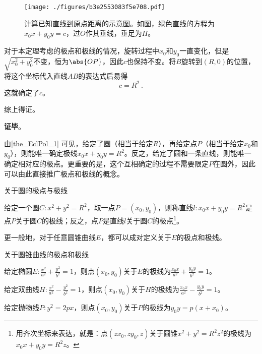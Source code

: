 \begin{figure}[ht]
\centering
\texttt{[image: ./figures/b3e2553083f5e708.pdf]}
\caption{计算已知直线到原点距离的示意图。如图，绿色直线的方程为$x_0x+y_0y=c$，过$O$作其垂线，垂足为$H$。} \label{fig_EclPol_2}
\end{figure}


对于本定理考虑的极点和极线的情况，旋转过程中$x_0$和$y_0$一直变化，但是$\sqrt{x_0^2+y_0^2}$不变，恒为$\abs{OP}$，因此$c$也保持不变。将$B$旋转到$(R, 0)$的位置，将这个坐标代入直线$AB$的表达式后易得
\begin{equation}
c=R^2~. 
\end{equation}
这就确定了$c$。

综上得证。

\textbf{证毕}。



由\autoref{the_EclPol_1} 可见，给定了圆（相当于给定$R$），再给定点$P$（相当于给定$x_0$和$y_0$），则能唯一确定极线$x_0x+y_0y=R^2$。反之，给定了圆和一条直线，则能唯一确定相对应的极点。更重要的是，这个互相确定的过程不需要限定$P$在圆外，因此可以由此直接推广极点和极线的概念。




\begin{definition}{关于圆的极点与极线}\label{def_EclPol_2}

给定一个圆$C: x^2+y^2=R^2$，取一点$P=(x_0, y_0)$，则称直线$l:x_0x+y_0y=R^2$是点$P$关于圆$C$的极线；反之，点$P$是直线$l$关于圆$C$的极点\footnote{用齐次坐标来表达，就是：点$(zx_0, zy_0, z)$关于圆锥$x^2+y^2=R^2z^2$的极线为$x_0x+y_0y=R^2z$。}。

\end{definition}





更一般地，对于任意圆锥曲线$E$，都可以成对定义关于$E$的极点和极线。



\begin{definition}{关于圆锥曲线的极点和极线}

给定椭圆$E:\frac{x^2}{a^2}+\frac{y^2}{b^2}=1$，则点$(x_0, y_0)$关于$E$的极线为$\frac{x_0x}{a^2}+\frac{y_0y}{b^2}=1$。

给定双曲线$H:\frac{x^2}{a^2}-\frac{y^2}{b^2}=1$，则点$(x_0, y_0)$关于$H$的极线为$\frac{x_0x}{a^2}-\frac{y_0y}{b^2}=1$。

给定抛物线$P:y^2=2px$，则点$(x_0, y_0)$关于$P$的极线为$y_0y=p(x+x_0)$。

\end{definition}




















